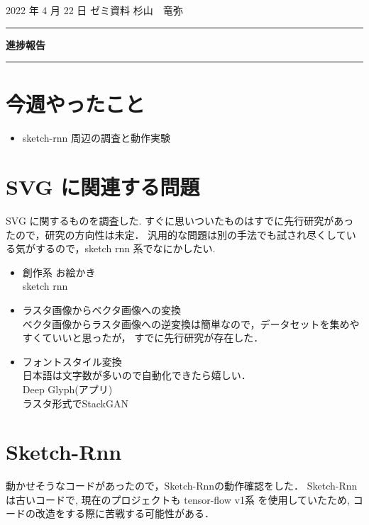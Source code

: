\documentclass[onecolumn]{ujarticle}   %
\begin{document}

		\noindent
		\hspace{1em}
		2022 年 4 月 22 日
		ゼミ資料
		\hfill
		杉山　竜弥
		\vspace{2mm}

		\hrule
		\begin{center}
			{\Large \bf 進捗報告}
		\end{center}
		\hrule
		\vspace{9mm}


\section{今週やったこと}
\begin{itemize}
  \item sketch-rnn 周辺の調査と動作実験
\end{itemize}

\section{SVG に関連する問題}
SVG に関するものを調査した. すぐに思いついたものはすでに先行研究があったので，研究の方向性は未定．
汎用的な問題は別の手法でも試され尽くしている気がするので，sketch rnn 系でなにかしたい.

\begin{itemize}
  \item 創作系  お絵かき\\
   sketch rnn\cite{ha2017neural}
  \item ラスタ画像からベクタ画像への変換\cite{liu2017raster}\\
      ベクタ画像からラスタ画像への逆変換は簡単なので，データセットを集めやすくていいと思ったが，
      すでに先行研究が存在した．
  \item フォントスタイル変換
  \\
  日本語は文字数が多いので自動化できたら嬉しい．\\
   Deep Glyph(アプリ)\\
   ラスタ形式でStackGAN
\end{itemize}

\section{Sketch-Rnn}
動かせそうなコードがあったので，Sketch-Rnnの動作確認をした．
Sketch-Rnn は古いコードで, 現在のプロジェクトも tensor-flow v1系 を使用していたため,
コードの改造をする際に苦戦する可能性がある．
\end{document}
